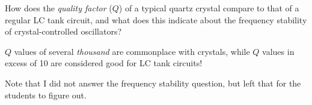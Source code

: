 

How does the {\it quality factor} ($Q$) of a typical quartz crystal compare to that of a regular LC tank circuit, and what does this indicate about the frequency stability of crystal-controlled oscillators?







$Q$ values of several {\it thousand} are commonplace with crystals, while $Q$ values in excess of 10 are considered good for LC tank circuits!







Note that I did not answer the frequency stability question, but left that for the students to figure out.




